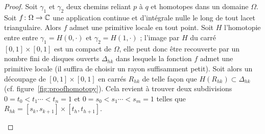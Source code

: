 \begin{proof}
Soit $\gamma_1$ et $\gamma_2$ deux chemins reliant $p$ à $q$ et homotopes dans un domaine $\Omega$. Soit $f \colon \Omega \to \C$ une application continue et d'intégrale nulle le long de tout lacet triangulaire. Alors $f$ admet une primitive locale en tout point. Soit $H$ l'homotopie entre entre $\gamma_1 = H(0,\cdot)$ et $\gamma_2=H(1,\cdot)$ ; l'image par $H$ du carré $[0,1]\times [0,1]$ est un compact de $\Omega$, elle peut donc être recouverte par un nombre fini de disques ouverts $\Delta_{hk}$ dans lesquels la fonction $f$ admet une primitive locale (il suffira de choisir un rayon suffisamment petit). Soit alors un découpage de $[0,1]\times [0,1]$ en carrés $R_{hk}$ de telle façon que $H(R_{hk}) \subset  \Delta_{hk}$ (cf. figure~\ref{fig:proofhomotopy}). Cela revient à trouver deux subdivisions $0=t_0 <t_1\cdots <t_n=1$ et $0=s_0 <s_1\cdots <s_m=1$ telles que $R_{hk} = [s_k,s_{k+1}] \times [t_h, t_{h+1}]$.




%

\begin{figure}[H]
\begin{center}
\shorthandoff{!}\shorthandoff{:}
\begin{tikzpicture}
  [decoration={markings,mark=at position 0.5 with {\arrow{>}}},
   witharrow/.style={postaction={decorate}},
   dot/.style={draw,fill,circle,inner sep=1.5pt,minimum width=0pt}
  ]


\end{tikzpicture}
\end{center}
\end{figure}
\end{proof}
